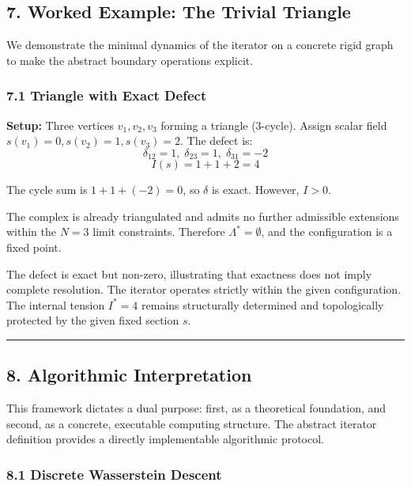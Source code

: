 \documentclass[
]{article}
\begin{document}
\subsection{7. Worked Example: The Trivial
Triangle}\label{worked-example-the-trivial-triangle}

We demonstrate the minimal dynamics of the iterator on a concrete rigid
graph to make the abstract boundary operations explicit.

\subsubsection{7.1 Triangle with Exact
Defect}\label{triangle-with-exact-defect}

\textbf{Setup:} Three vertices \(v_1, v_2, v_3\) forming a triangle
(3-cycle). Assign scalar field \(s(v_1) = 0, s(v_2) = 1, s(v_3) = 2\).
The defect is:
\[\delta_{12} = 1, \; \delta_{23} = 1, \; \delta_{31} = -2\]
\[I(s) = 1 + 1 + 2 = 4\]

The cycle sum is \(1 + 1 + (-2) = 0\), so \(\delta\) is exact. However,
\(I > 0\).

The complex is already triangulated and admits no further admissible
extensions within the \(N=3\) limit constraints. Therefore
\(\Lambda^* = \emptyset\), and the configuration is a fixed point.

The defect is exact but non-zero, illustrating that exactness does not
imply complete resolution. The iterator operates strictly within the
given configuration. The internal tension \(I^* = 4\) remains
structurally determined and topologically protected by the given fixed
section \(s\).

\begin{center}\rule{0.5\linewidth}{0.5pt}\end{center}

\subsection{8. Algorithmic
Interpretation}\label{algorithmic-interpretation}

This framework dictates a dual purpose: first, as a theoretical
foundation, and second, as a concrete, executable computing structure.
The abstract iterator definition provides a directly implementable
algorithmic protocol.

\subsubsection{8.1 Discrete Wasserstein
Descent}\label{discrete-wasserstein-descent}
\end{document}
